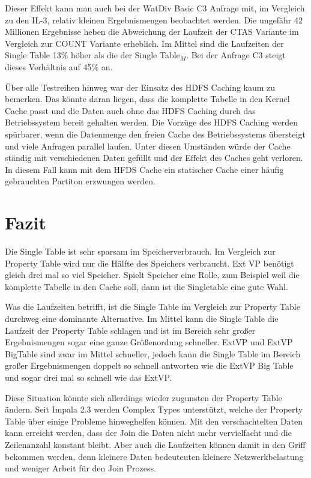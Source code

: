 \documentclass[
  a4paper,
  12pt,
  oneside,
  parskip=half,
  headsepline,
]{scrartcl}
\begin{document}
Dieser Effekt kann man auch bei der WatDiv Basic C3 Anfrage mit, im Vergleich zu
den IL-3, relativ kleinen Ergebnismengen beobachtet werden. Die ungefähr 42
Millionen Ergebnisse heben die Abweichung der Laufzeit der CTAS Variante im
Vergleich zur COUNT Variante erheblich. Im Mittel sind die Laufzeiten der
Single Table 13\% höher als die der Single Table$_M$. Bei der Anfrage C3 steigt
dieses Verhältnis auf 45\% an.

Über alle Testreihen hinweg war der Einsatz des HDFS Caching kaum zu bemerken.
Das könnte daran liegen, dass die komplette Tabelle in den Kernel Cache passt
und die Daten auch ohne das HDFS Caching durch das Betriebssystem bereit
gehalten werden. Die Vorzüge des HDFS Caching werden spürbarer, wenn die
Datenmenge den freien Cache des Betriebssystems übersteigt und viele Anfragen
parallel laufen. Unter diesen Umständen würde der Cache ständig mit
verschiedenen Daten gefüllt und der Effekt des Caches geht verloren. In diesem
Fall kann mit dem HFDS Cache ein statischer Cache einer häufig gebrauchten
Partiton erzwungen werden.

\section{Fazit}
\label{sec:conclusion}

Die Single Table ist sehr sparsam im Speicherverbrauch. Im Vergleich zur
Property Table wird nur die Hälfte des Speichers verbraucht. Ext VP benötigt
gleich drei mal so viel Speicher. Spielt Speicher eine Rolle, zum Beispiel weil
die komplette Tabelle in den Cache soll, dann ist die Singletable eine gute
Wahl.

Was die Laufzeiten betrifft, ist die Single Table im Vergleich zur Property
Table durchweg eine dominante Alternative. Im Mittel kann die Single Table die
Laufzeit der Property Table schlagen und ist im Bereich sehr großer
Ergebnismengen sogar eine ganze Größenordung schneller. ExtVP und ExtVP BigTable
sind zwar im Mittel schneller, jedoch kann die Single Table im Bereich großer
Ergebnismengen doppelt so schnell antworten wie die ExtVP Big Table und sogar
drei mal so schnell wie das ExtVP.

Diese Situation könnte sich allerdings wieder zugunsten der Property Table
ändern. Seit Impala 2.3 werden Complex Types unterstützt, welche der Property
Table über einige Probleme hinweghelfen können. Mit den verschachtelten Daten
kann erreicht werden, dass der Join die Daten nicht mehr vervielfacht und die
Zeilenanzahl konstant bleibt. Aber auch die Laufzeiten können damit in den Griff
bekommen werden, denn kleinere Daten bedeuteuten kleinere Netzwerkbelastung und
weniger Arbeit für den Join Prozess.
\end{document}
